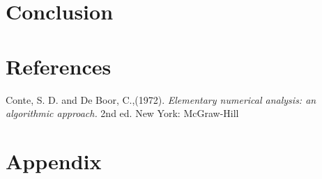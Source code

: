\documentclass{article}
\begin{document}
\section{Conclusion}

\section{References}
Conte, S. D. and De Boor, C.,(1972). {\it Elementary numerical analysis: an algorithmic approach.} 2nd ed. New York: McGraw-Hill

\section{Appendix}
\end{document}

